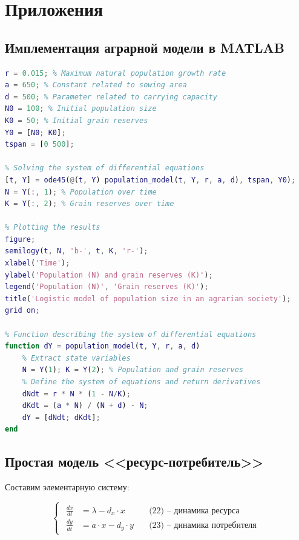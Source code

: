 \documentclass[a4paper, 14pt]{extarticle}
\begin{document}
\newpage

\section*{Приложения}

\appendix

\renewcommand{\appendixname}{Приложение}
\renewcommand{\thesection}{\arabic{section}.}

\subsection{Имплементация аграрной модели в MATLAB}

\begin{lstlisting}[language=matlab, caption={Модель с производством ресурсов.}]
% Parameters
r = 0.015; % Maximum natural population growth rate
a = 650; % Constant related to sowing area
d = 500; % Parameter related to carrying capacity
N0 = 100; % Initial population size
K0 = 50; % Initial grain reserves
Y0 = [N0; K0];
tspan = [0 500];

% Solving the system of differential equations
[t, Y] = ode45(@(t, Y) population_model(t, Y, r, a, d), tspan, Y0);
N = Y(:, 1); % Population over time
K = Y(:, 2); % Grain reserves over time

% Plotting the results
figure;
semilogy(t, N, 'b-', t, K, 'r-');
xlabel('Time');
ylabel('Population (N) and grain reserves (K)');
legend('Population (N)', 'Grain reserves (K)');
title('Logistic model of population size in an agrarian society');
grid on;

% Function describing the system of differential equations
function dY = population_model(t, Y, r, a, d)
    % Extract state variables
    N = Y(1); K = Y(2); % Population and grain reserves
    % Define the system of equations and return derivatives
    dNdt = r * N * (1 - N/K);
    dKdt = (a * N) / (N + d) - N;
    dY = [dNdt; dKdt];
end
\end{lstlisting}

\newpage

\subsection{Простая модель <<ресурс-потребитель>>}

Составим элементарную систему:

\begin{equation}
    \begin{cases}
        \begin{aligned}
        \frac{dx}{dt} &= \lambda - d_x \cdot x \quad &\text{(22) -- динамика ресурса} \\
        \frac{dy}{dt} &= a \cdot x - d_y \cdot y \quad &\text{(23) -- динамика потребителя}
        \end{aligned}
    \end{cases}
\end{equation}
\end{document}
